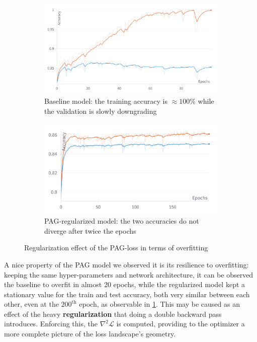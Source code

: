 \documentclass[../thesis.tex]{subfiles}
\begin{document}
\begin{figure}
    \centering
    \begin{subfigure}{0.48\linewidth}
        \centering
        \includegraphics[width=\linewidth]{assets/pag/binary_classifier/baseline_overfitting.png}
        \caption{Baseline model: the training accuracy is $\approx 100\%$ while the validation is slowly downgrading}
    \end{subfigure}
    \hfill
    \begin{subfigure}{0.48\linewidth}
        \centering
        \includegraphics[width=\linewidth]{assets/pag/binary_classifier/pag_regular_accuracy.png}
        \caption{PAG-regularized model: the two accuracies do not diverge after twice the epochs}
    \end{subfigure}
    \caption{Regularization effect of the PAG-loss in terms of overfitting}
    \label{fig:pag_regularization_overfitting}
\end{figure}

A nice property of the PAG model we observed it is its resilience to overfitting:
keeping the same hyper-parameters and network architecture, it can be observed the baseline to overfit in almost 20 epochs, while the regularized model kept a stationary value for the train and test accuracy, both very similar between each other, even at the $200^\text{th}$ epoch, as observable in \cref{fig:pag_regularization_overfitting}.
This may be caused as an effect of the heavy \textbf{regularization} that doing a double backward pass introduces. Enforcing this, the $\nabla^2 \mathcal{L}$ is computed, providing to the optimizer a more complete picture of the loss landscape's geometry.
\end{document}
